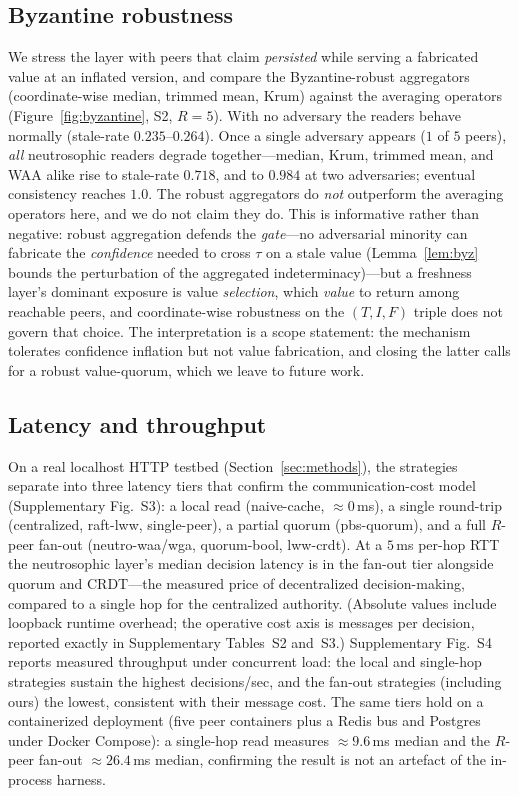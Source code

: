 \documentclass[fleqn,10pt]{wlscirep}
\begin{document}
\subsection{Byzantine robustness}
We stress the layer with peers that claim
\emph{persisted} while serving a fabricated value at an inflated version, and compare the
Byzantine-robust aggregators (coordinate-wise median, trimmed mean, Krum) against the averaging
operators (Figure~\ref{fig:byzantine}, S2, $R=5$). With no adversary the readers behave normally
(stale-rate $0.235$--$0.264$). Once a single adversary appears ($1$ of $5$ peers), \emph{all}
neutrosophic readers degrade together---median, Krum, trimmed mean, and WAA alike rise to stale-rate
$0.718$, and to $0.984$ at two adversaries; eventual consistency reaches $1.0$. The robust aggregators do
\emph{not} outperform the averaging operators here, and we do not claim they do. This is informative
rather than negative: robust aggregation defends the \emph{gate}---no adversarial minority can fabricate
the \emph{confidence} needed to cross $\tau$ on a stale value (Lemma~\ref{lem:byz} bounds the perturbation of the
aggregated indeterminacy)---but a freshness layer's dominant exposure is value \emph{selection}, which
\emph{value} to return among reachable peers, and coordinate-wise robustness on the $(T,I,F)$ triple does
not govern that choice. The interpretation is a scope statement: the mechanism tolerates confidence
inflation but not value fabrication, and closing the latter calls for a robust value-quorum, which we
leave to future work.

\subsection{Latency and throughput}
On a real localhost HTTP testbed (Section~\ref{sec:methods}), the
strategies separate into three latency tiers that confirm the communication-cost model
(Supplementary Fig.~S3): a local read (naive-cache, $\approx 0$\,ms), a single round-trip
(centralized, raft-lww, single-peer), a partial quorum (pbs-quorum), and a full $R$-peer fan-out
(neutro-waa/wga, quorum-bool, lww-crdt). At a $5$\,ms per-hop RTT the neutrosophic layer's median
decision latency is in the fan-out tier alongside quorum and CRDT---the measured price of decentralized
decision-making, compared to a single hop for the centralized authority. (Absolute values include loopback
runtime overhead; the operative cost axis is messages per decision, reported exactly in
Supplementary Tables~S2 and~S3.) Supplementary Fig.~S4 reports measured
throughput under concurrent load: the local and single-hop strategies sustain the highest
decisions/sec, and the fan-out strategies (including ours) the lowest, consistent with their message
cost. The same tiers hold on a containerized deployment (five peer containers plus a Redis bus and
Postgres under Docker Compose): a single-hop read measures $\approx 9.6$\,ms median and the $R$-peer
fan-out $\approx 26.4$\,ms median, confirming the result is not an artefact of the in-process harness.
\end{document}
